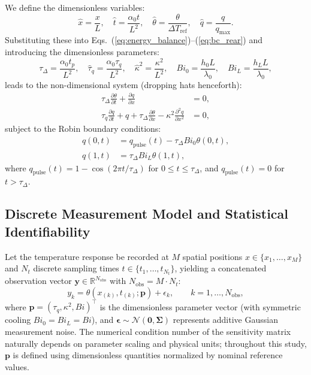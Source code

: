 \documentclass[preprint,12pt]{elsarticle}
\begin{document}
We define the dimensionless variables:
\begin{equation}
\hat{x} = \frac{x}{L}, \quad \hat{t} = \frac{\alpha_0 t}{L^2}, \quad \hat{\theta} = \frac{\theta}{\Delta T_{\mathrm{ref}}}, \quad \hat{q} = \frac{q}{q_{\max}}.
\end{equation}
Substituting these into Eqs.~(\ref{eq:energy_balance})--(\ref{eq:bc_rear}) and introducing the dimensionless parameters:
\begin{equation}
\tau_\Delta = \frac{\alpha_0 t_p}{L^2}, \quad \hat{\tau}_q = \frac{\alpha_0 \tau_q}{L^2}, \quad \hat{\kappa}^2 = \frac{\kappa^2}{L^2}, \quad Bi_0 = \frac{h_0 L}{\lambda_0}, \quad Bi_L = \frac{h_L L}{\lambda_0},
\end{equation}
leads to the non-dimensional system (dropping hats henceforth):
\begin{align}
\tau_\Delta \frac{\partial \theta}{\partial t} + \frac{\partial q}{\partial x} &= 0, \label{eq:pde_dimless_1} \\
\tau_q \frac{\partial q}{\partial t} + q + \tau_\Delta \frac{\partial \theta}{\partial x} - \kappa^2 \frac{\partial^2 q}{\partial x^2} &= 0, \label{eq:pde_dimless_2}
\end{align}
subject to the Robin boundary conditions:
\begin{align}
q(0, t) &= q_{\mathrm{pulse}}(t) - \tau_\Delta Bi_0 \theta(0, t), \label{eq:bc_dimless_1} \\
q(1, t) &= \tau_\Delta Bi_L \theta(1, t), \label{eq:bc_dimless_2}
\end{align}
where $q_{\mathrm{pulse}}(t) = 1 - \cos(2\pi t / \tau_\Delta)$ for $0 \le t \le \tau_\Delta$, and $q_{\mathrm{pulse}}(t) = 0$ for $t > \tau_\Delta$.

\subsection{Discrete Measurement Model and Statistical Identifiability}
\label{sec:fim_formulation}

Let the temperature response be recorded at $M$ spatial positions $x \in \{x_1, \dots, x_M\}$ and $N_t$ discrete sampling times $t \in \{t_1, \dots, t_{N_t}\}$, yielding a concatenated observation vector $\bm{y} \in \mathbb{R}^{N_{\mathrm{obs}}}$ with $N_{\mathrm{obs}} = M \cdot N_t$:
\begin{equation}
y_k = \theta(x_{(k)}, t_{(k)}; \bm{p}) + \epsilon_k, \qquad k = 1, \dots, N_{\mathrm{obs}},
\label{eq:meas_model}
\end{equation}
where $\bm{p} = (\tau_q, \kappa^2, Bi)^\top$ is the dimensionless parameter vector (with symmetric cooling $Bi_0 = Bi_L = Bi$), and $\bm{\epsilon} \sim \mathcal{N}(\bm{0}, \bm{\Sigma})$ represents additive Gaussian measurement noise. The numerical condition number of the sensitivity matrix naturally depends on parameter scaling and physical units; throughout this study, $\bm{p}$ is defined using dimensionless quantities normalized by nominal reference values.
\end{document}
